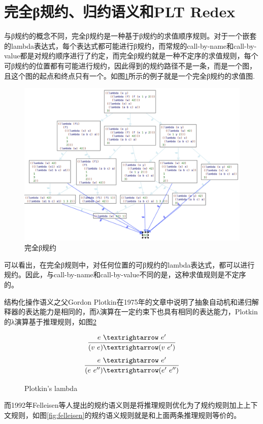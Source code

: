 \section{完全β规约、归约语义和PLT Redex}
与β规约的概念不同，完全β规约是一种基于β规约的求值顺序规则。对于一个嵌套的lambda表达式，每个表达式都可能进行β规约，而常规的call-by-name和call-by-value都是对规约顺序进行了约定，而完全β规约就是一种不定序的求值规则，每个可β规约的位置都有可能进行规约，因此得到的规约路径不是一条，而是一个图，且这个图的起点和终点只有一个。如图\ref{fig:beta}所示的例子就是一个完全β规约的求值图.

\begin{figure}[h]
	\centering
	\includegraphics[width=12cm]{images/chapter2/fullbeta.png}
	\caption{完全β规约}
	\label{fig:beta}
\end{figure}

可以看出，在完全β规则中，对任何位置的可β规约的lambda表达式，都可以进行规约。因此，与call-by-name和call-by-value不同的是，这种求值规则是不定序的。

结构化操作语义之父Gordon Plotkin在1975年的文章中说明了抽象自动机和递归解释器的表达能力是相同的，而λ演算在一定约束下也具有相同的表达能力，Plotkin的λ演算基于推理规则，如图\ref{fig:plotkin}

\begin{figure}[h]
	\centering
	\[\infer {(v~e) → (v~e')}{e~→~e'}  \]
	\[\infer {(e~e'') → (e'~e'')} {e~→~e'}  \]
	\caption{Plotkin's lambda}
	\label{fig:plotkin}
\end{figure} 

	

而1992年Felleisen等人提出的规约语义则是将推理规则优化为了规约规则加上上下文规则，如图\ref{fig:felleisen}的规约语义规则就是和上面两条推理规则等价的。


